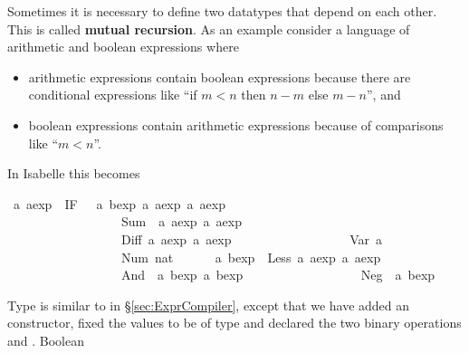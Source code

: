 %
\begin{isabellebody}%
\def\isabellecontext{ABexpr}%
\isamarkupfalse%
%
\begin{isamarkuptext}%
%
Sometimes it is necessary to define two datatypes that depend on each
other. This is called \textbf{mutual recursion}. As an example consider a
language of arithmetic and boolean expressions where
\begin{itemize}
\item arithmetic expressions contain boolean expressions because there are
  conditional expressions like ``if $m<n$ then $n-m$ else $m-n$'',
  and
\item boolean expressions contain arithmetic expressions because of
  comparisons like ``$m<n$''.
\end{itemize}
In Isabelle this becomes%
\end{isamarkuptext}%
\isamarkuptrue%
\ {\isacharprime}a\ aexp\ {\isacharequal}\ IF\ \ \ {\isachardoublequote}{\isacharprime}a\ bexp{\isachardoublequote}\ {\isachardoublequote}{\isacharprime}a\ aexp{\isachardoublequote}\ {\isachardoublequote}{\isacharprime}a\ aexp{\isachardoublequote}\isanewline
\ \ \ \ \ \ \ \ \ \ \ \ \ \ \ \ \ {\isacharbar}\ Sum\ \ {\isachardoublequote}{\isacharprime}a\ aexp{\isachardoublequote}\ {\isachardoublequote}{\isacharprime}a\ aexp{\isachardoublequote}\isanewline
\ \ \ \ \ \ \ \ \ \ \ \ \ \ \ \ \ {\isacharbar}\ Diff\ {\isachardoublequote}{\isacharprime}a\ aexp{\isachardoublequote}\ {\isachardoublequote}{\isacharprime}a\ aexp{\isachardoublequote}\isanewline
\ \ \ \ \ \ \ \ \ \ \ \ \ \ \ \ \ {\isacharbar}\ Var\ {\isacharprime}a\isanewline
\ \ \ \ \ \ \ \ \ \ \ \ \ \ \ \ \ {\isacharbar}\ Num\ nat\isanewline
{}\ \ \ \ \ \ {\isacharprime}a\ bexp\ {\isacharequal}\ Less\ {\isachardoublequote}{\isacharprime}a\ aexp{\isachardoublequote}\ {\isachardoublequote}{\isacharprime}a\ aexp{\isachardoublequote}\isanewline
\ \ \ \ \ \ \ \ \ \ \ \ \ \ \ \ \ {\isacharbar}\ And\ \ {\isachardoublequote}{\isacharprime}a\ bexp{\isachardoublequote}\ {\isachardoublequote}{\isacharprime}a\ bexp{\isachardoublequote}\isanewline
\ \ \ \ \ \ \ \ \ \ \ \ \ \ \ \ \ {\isacharbar}\ Neg\ \ {\isachardoublequote}{\isacharprime}a\ bexp{\isachardoublequote}\isamarkupfalse%
%
\begin{isamarkuptext}%
\noindent
Type  is similar to  in \S\ref{sec:ExprCompiler},
except that we have added an  constructor,
fixed the values to be of type  and declared the two binary
operations  and .  Boolean

\end{isamarkuptext}
\end{isabellebody}

